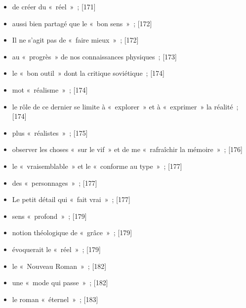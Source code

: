 \documentclass[12pt, a4paper]{article}
\begin{document}
\begin{itemize}
	\item de créer du «~réel~»{\color{gray}~; [171]}

	\item aussi bien partagé que le «~bon sens~»{\color{gray}~; [172]}

	\item Il ne s’agit pas de «~faire mieux~»{\color{gray}~; [172]}

	\item au «~progrès~» de nos connaissances physiques{\color{gray}~; [173]}

	\item le «~bon outil~» dont la critique soviétique{\color{gray}~; [174]}

	\item mot «~réalisme~»{\color{gray}~; [174]}

	\item le rôle de ce dernier se limite à «~explorer~» et à «~exprimer~» la réalité{\color{gray}~; [174]}

	\item plus «~réalistes~»{\color{gray}~; [175]}

	\item observer les choses «~sur le vif~» et de me «~rafraîchir la mémoire~»{\color{gray}~; [176]}

	\item le «~vraisemblable~» et le «~conforme au type~»{\color{gray}~; [177]}

	\item des «~personnages~»{\color{gray}~; [177]}

	\item Le petit détail qui «~fait vrai~»{\color{gray}~; [177]}

	\item sens «~profond~»{\color{gray}~; [179]}

	\item notion théologique de «~grâce~»{\color{gray}~; [179]}

	\item évoquerait le «~réel~»{\color{gray}~; [179]}

	\item le «~Nouveau Roman~»{\color{gray}~; [182]}

	\item une «~mode qui passe~»{\color{gray}~; [182]}

	\item le roman «~éternel~»{\color{gray}~; [183]}
\end{itemize}
\end{document}
